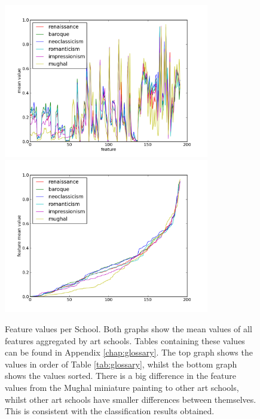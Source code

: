 \documentclass[11pt,a4paper,twoside,openright]{report}
\begin{document}
\begin{figure}[tbp]
\centering
\includegraphics[width=0.8\textwidth]{school-graph}
\includegraphics[width=0.8\textwidth]{school-sort}
\caption[Feature Values]{Feature values per School.  Both graphs show the mean
values of all features aggregated by art schools.  Tables containing these
values can be found in Appendix \ref{chap:glossary}.  The top graph shows the
values in order of Table \ref{tab:glossary}, whilst the bottom graph shows the
values sorted.  There is a big difference in the feature values from the Mughal
miniature painting to other art schools, whilst other art schools have smaller
differences between themselves.  This is consistent with the classification
results obtained.}
\label{fig:school}
\end{figure}

\end{document}
